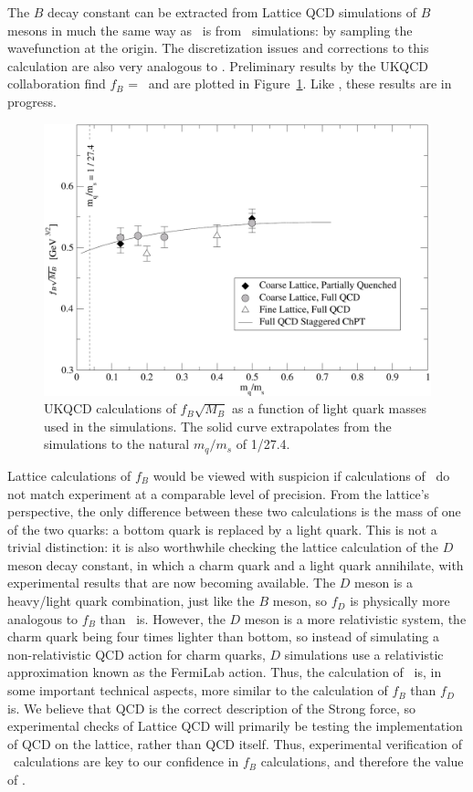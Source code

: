 \documentclass{cornell}
\begin{document}
The $B$ decay constant can be extracted from Lattice QCD simulations
of $B$ mesons in much the same way as \gee\ is from \ups\ simulations:
by sampling the wavefunction at the origin.  The discretization issues
and corrections to this calculation are also very analogous to \gee.
Preliminary results by the UKQCD collaboration find $f_B$ = \bork\ and
are plotted in Figure~\ref{fbresults}.  Like \gee, these results are
in progress.

\begin{figure}[p]
  \begin{center}
    \includegraphics[width=\linewidth]{plots/fbresults}
  \end{center}
  \caption{\label{fbresults} UKQCD calculations of $f_B \sqrt{M_B}$ as
  a function of light quark masses used in the simulations.  The solid
  curve extrapolates from the simulations to the natural $m_q/m_s$ of
  1/27.4.}
\end{figure}

Lattice calculations of $f_B$ would be viewed with suspicion if
calculations of \gee\ do not match experiment at a comparable level of
precision.  From the lattice's perspective, the only difference
between these two calculations is the mass of one of the two quarks: a
bottom quark is replaced by a light quark.  This is not a trivial
distinction: it is also worthwhile checking the lattice calculation of
the $D$ meson decay constant, in which a charm quark and a light quark
annihilate, with experimental results that are now becoming available.
The $D$ meson is a heavy/light quark combination, just like the $B$
meson, so $f_D$ is physically more analogous to $f_B$ than \gee\ is.
However, the $D$ meson is a more relativistic system, the charm quark
being four times lighter than bottom, so instead of simulating a
non-relativistic QCD action for charm quarks, $D$ simulations use a
relativistic approximation known as the FermiLab action.  Thus, the
calculation of \gee\ is, in some important technical aspects, more
similar to the calculation of $f_B$ than $f_D$ is.  We believe that
QCD is the correct description of the Strong force, so experimental
checks of Lattice QCD will primarily be testing the implementation of
QCD on the lattice, rather than QCD itself.  Thus, experimental
verification of \gee\ calculations are key to our confidence in $f_B$
calculations, and therefore the value of \vtd.
\end{document}
